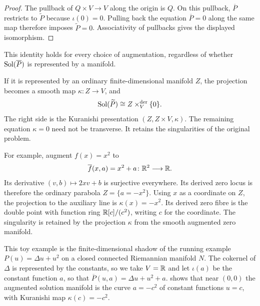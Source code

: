 
\begin{proof}
The pullback of $Q\times V\to V$ along the origin is $Q$.
On this pullback, $\overline P$ restricts to $\widetilde P$ because
$\iota(0)=0$. Pulling back the equation $\overline P=0$ along the
same map therefore imposes $\widetilde P=0$.
Associativity of pullbacks gives the displayed isomorphism.
\end{proof}

This identity holds for every choice of augmentation, regardless of
whether $\operatorname{Sol}(\overline P)$ is represented by a manifold.

If it is represented by an ordinary finite-dimensional manifold $Z$,
the projection becomes a smooth map $\kappa\colon Z\to V$, and
\[
 \operatorname{Sol}(\widetilde P)\cong Z\times_V^{\mathrm{der}}\{0\}.
\]
The right side is the Kuranishi presentation $(Z,Z\times V,\kappa)$.
The remaining equation $\kappa=0$ need not be transverse.
It retains the singularities of the original problem.

For example, augment $f(x)=x^2$ to
\[
 \overline f(x,a)=x^2+a\colon\mathbb{R}^2\longrightarrow\mathbb{R}.
\]
Its derivative $(v,b)\mapsto2xv+b$ is surjective everywhere. Its derived
zero locus is therefore the ordinary parabola $Z=\{a=-x^2\}$.
Using $x$ as a coordinate on $Z$, the projection to the auxiliary line
is $\kappa(x)=-x^2$. Its derived zero fibre is the double point with
function ring $\mathbb{R}[c]/(c^2)$, writing $c$ for the coordinate.
The singularity is retained by the projection $\kappa$ from the smooth
augmented zero manifold.

This toy example is the finite-dimensional shadow of the running
example $P(u)=\Delta u+u^2$ on a closed connected Riemannian manifold
$N$. The cokernel of $\Delta$ is represented by the constants, so we
take $V=\mathbb{R}$ and let $\iota(a)$
be the constant function $a$, so that $\overline P(u,a)=\Delta u+u^2+a$.
 shows that near
$(0,0)$ the augmented solution manifold is the curve $a=-c^2$ of
constant functions $u=c$, with Kuranishi map $\kappa(c)=-c^2$.

